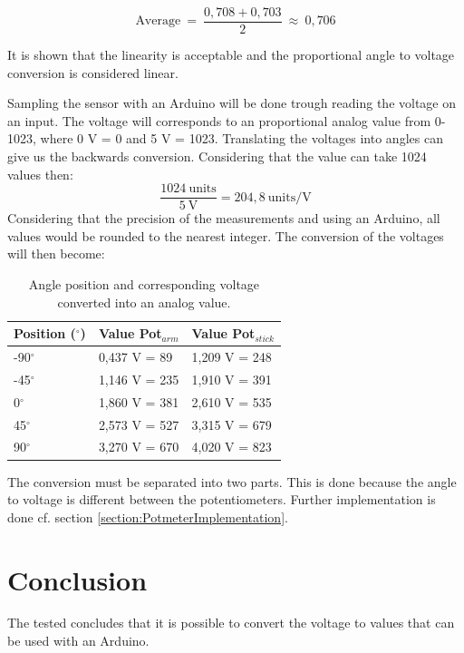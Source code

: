 \begin{equation}
\text{Average}\ =\ \dfrac{0,708 + 0,703}{2}\ \approx\ 0,706 
\end{equation}

It is shown that the linearity is acceptable and the proportional angle to voltage conversion is considered linear.


Sampling the sensor with an Arduino will be done trough reading the voltage on an input. The voltage will corresponds to an proportional analog value from 0-1023, where 0 V = 0 and 5 V = 1023. Translating the voltages into angles can give us the backwards conversion. Considering that the value can take 1024 values then:
\begin{equation}
\dfrac{1024\ \text{units}}{5\ \text{V}} = 204,8\ \text{units/V}
\end{equation}     
Considering that the precision of the measurements and using an Arduino, all values would be rounded to the nearest integer. The conversion of the voltages will then become:
\begin{table}[htbp]
\centering
\begin{tabular}{lll}
\hline
Position ($^\circ$) & Value Pot$_{arm}$ & Value Pot$_{stick}$ \\ \hline
-90$^\circ$         & 0,437 V = 89         & 1,209 V = 248                   \\
-45$^\circ$         & 1,146 V = 235        & 1,910 V = 391                   \\
0$^\circ$           & 1,860 V = 381    & 2,610 V = 535                    \\
45$^\circ$          & 2,573 V = 527    & 3,315 V = 679                   \\
90$^\circ$          & 3,270 V = 670   & 4,020 V = 823                  
\end{tabular}
\caption{Angle position and corresponding voltage converted into an analog value.}
\label{AngleTable}
\end{table}

The conversion must be separated into two parts. This is done because the angle to voltage is different between the potentiometers.
Further implementation is done cf. section \ref{section:PotmeterImplementation}.
\section*{Conclusion}
The tested concludes that it is possible to convert the voltage to values that can be used with an Arduino.

